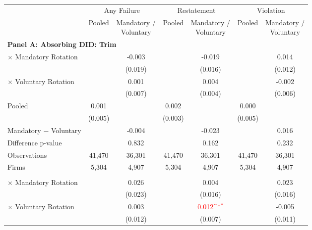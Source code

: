 \documentclass[10pt]{article}
\newcommand{\sym}[1]{\textsuperscript{#1}}
\begin{document}
\begin{minipage}{19cm}\fontsize{10}{12}\selectfont\setlength{\tabcolsep}{4pt}\renewcommand{\arraystretch}{1.12}


\def\sym#1{\ifmmode^{#1}\else\(^{#1}\)\fi}
\centering
{}
\label{tab:absorbing-transition-bachelor-plus-downgrade-no-auditfirm-fe}
\begin{threeparttable}

\begin{tabular}{l cc cc cc}
\toprule
 & \multicolumn{2}{c}{Any Failure} & \multicolumn{2}{c}{Restatement} & \multicolumn{2}{c}{Violation} \\
\cmidrule(lr){2-3}\cmidrule(lr){4-5}\cmidrule(lr){6-7}
 & Pooled & \shortstack{Mandatory /\\Voluntary} & Pooled & \shortstack{Mandatory /\\Voluntary} & Pooled & \shortstack{Mandatory /\\Voluntary} \\
\midrule
\multicolumn{7}{l}{\textbf{Panel A: Absorbing DID: Trim}} \\
$\times$ Mandatory Rotation &  & -0.003 &  & -0.019 &  & 0.014 \\
 &  & (0.019) &  & (0.016) &  & (0.012) \\
$\times$ Voluntary Rotation &  & 0.001 &  & 0.004 &  & -0.002 \\
 &  & (0.007) &  & (0.004) &  & (0.006) \\
Pooled & 0.001 &  & 0.002 &  & 0.000 &  \\
 & (0.005) &  & (0.003) &  & (0.005) &  \\
Mandatory $-$ Voluntary &  & -0.004 &  & -0.023 &  & 0.016 \\
Difference p-value &  & 0.832 &  & 0.162 &  & 0.232 \\
Observations & 41,470 & 36,301 & 41,470 & 36,301 & 41,470 & 36,301 \\
Firms & 5,304 & 4,907 & 5,304 & 4,907 & 5,304 & 4,907 \\
\addlinespace
\multicolumn{7}{l}{\textbf{Panel B: Absorbing DID: Strict}} \\
$\times$ Mandatory Rotation &  & 0.026 &  & 0.004 &  & 0.023 \\
 &  & (0.023) &  & (0.016) &  & (0.016) \\
$\times$ Voluntary Rotation &  & 0.003 &  & \textcolor{red}{0.012\sym{*}} &  & -0.005 \\
 &  & (0.012) &  & (0.007) &  & (0.011) \\

\end{tabular}
\end{threeparttable}
\end{minipage}
\end{document}
